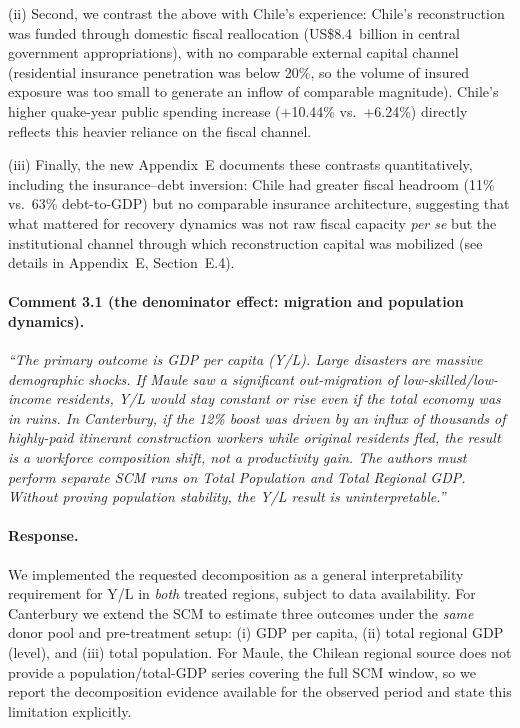 (ii) Second, we contrast the above with Chile's experience: Chile's reconstruction was funded through domestic fiscal reallocation (US\$8.4~billion in central government appropriations), with no comparable external capital channel (residential insurance penetration was below 20\%, so the volume of insured exposure was too small to generate an inflow of comparable magnitude). Chile's higher quake-year public spending increase (+10.44\% vs.\ +6.24\%) directly reflects this heavier reliance on the fiscal channel.

(iii) Finally, the new Appendix~E documents these contrasts quantitatively, including the insurance--debt inversion: Chile had greater fiscal headroom (11\% vs.\ 63\% debt-to-GDP) but no comparable insurance architecture, suggesting that what mattered for recovery dynamics was not raw fiscal capacity \textit{per se} but the institutional channel through which reconstruction capital was mobilized (see details in Appendix~E, Section~E.4).

\paragraph{Comment 3.1 (the denominator effect: migration and population dynamics).}
\textit{``The primary outcome is GDP per capita (Y/L). Large disasters are massive demographic shocks. If Maule saw a significant out-migration of low-skilled/low-income residents, Y/L would stay constant or rise even if the total economy was in ruins. In Canterbury, if the 12\% boost was driven by an influx of thousands of highly-paid itinerant construction workers while original residents fled, the result is a workforce composition shift, not a productivity gain. The authors must perform separate SCM runs on Total Population and Total Regional GDP. Without proving population stability, the Y/L result is uninterpretable.''}

\paragraph{Response.}
We implemented the requested decomposition as a general interpretability requirement for Y/L in \emph{both} treated regions, subject to data availability. For Canterbury we extend the SCM to estimate three outcomes under the \emph{same} donor pool and pre-treatment setup: (i) GDP per capita, (ii) total regional GDP (level), and (iii) total population. For Maule, the Chilean regional source does not provide a population/total-GDP series covering the full SCM window, so we report the decomposition evidence available for the observed period and state this limitation explicitly.

